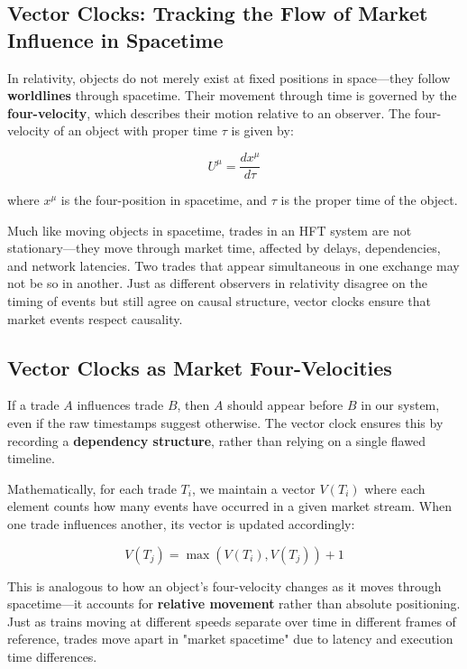 \subsection{Vector Clocks: Tracking the Flow of Market Influence in Spacetime}

In relativity, objects do not merely exist at fixed positions in space—they follow \textbf{worldlines} through spacetime. Their movement through time is governed by the \textbf{four-velocity}, which describes their motion relative to an observer. The four-velocity of an object with proper time \( \tau \) is given by:

\[
U^\mu = \frac{dx^\mu}{d\tau}
\]

where \( x^\mu \) is the four-position in spacetime, and \( \tau \) is the proper time of the object.

Much like moving objects in spacetime, trades in an HFT system are not stationary—they move through market time, affected by delays, dependencies, and network latencies. Two trades that appear simultaneous in one exchange may not be so in another. Just as different observers in relativity disagree on the timing of events but still agree on causal structure, vector clocks ensure that market events respect causality.

\subsection{Vector Clocks as Market Four-Velocities}

If a trade \( A \) influences trade \( B \), then \( A \) should appear before \( B \) in our system, even if the raw timestamps suggest otherwise. The vector clock ensures this by recording a \textbf{dependency structure}, rather than relying on a single flawed timeline.

Mathematically, for each trade \( T_i \), we maintain a vector \( V(T_i) \) where each element counts how many events have occurred in a given market stream. When one trade influences another, its vector is updated accordingly:

\[
V(T_j) = \max(V(T_i), V(T_j)) + 1
\]

This is analogous to how an object’s four-velocity changes as it moves through spacetime—it accounts for \textbf{relative movement} rather than absolute positioning. Just as trains moving at different speeds separate over time in different frames of reference, trades move apart in "market spacetime" due to latency and execution time differences.

